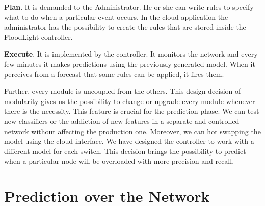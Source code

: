 \documentclass[12pt]{article}
\begin{document}
\textbf{Plan}. It is demanded to the Administrator.
He or she can write rules to specify what to do when a particular event occurs.
In the cloud application the administrator has the possibility to create the rules that are stored inside the FloodLight controller.


\textbf{Execute}. It is implemented by the controller. 
It monitors the network and every few minutes it makes predictions using the previously generated model.
When it perceives from a forecast that some rules can be applied, it fires them.


Further, every module is uncoupled from the others. 
This design decision of modularity gives us the possibility to change or upgrade every module whenever there is the necessity.
This feature is crucial for the prediction phase.
We can test new classifiers or the addiction of new features in a separate and controlled network without affecting the production one. Moreover, we can hot swapping the model using the cloud interface.
We have designed the controller to work with a different model for each switch. 
This decision brings the possibility to predict when a particular node will be overloaded with more precision and recall.\\

 







\section{Prediction over the Network}
\end{document}

